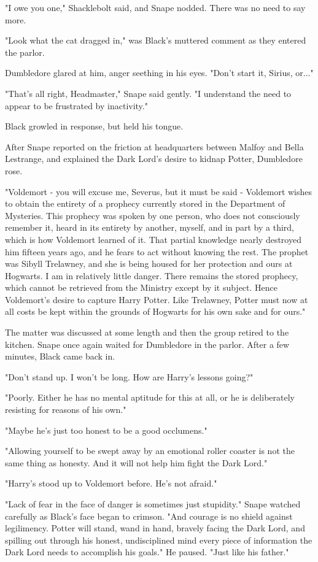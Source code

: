 "I owe you one," Shacklebolt said, and Snape nodded. There was no need to say more.

"Look what the cat dragged in," was Black's muttered comment as they entered the parlor.

Dumbledore glared at him, anger seething in his eyes. "Don't start it, Sirius, or..."

"That's all right, Headmaster," Snape said gently. "I understand the need to appear to be frustrated by inactivity."

Black growled in response, but held his tongue.

After Snape reported on the friction at headquarters between Malfoy and Bella Lestrange, and explained the Dark Lord's desire to kidnap Potter, Dumbledore rose.

"Voldemort - you will excuse me, Severus, but it must be said - Voldemort wishes to obtain the entirety of a prophecy currently stored in the Department of Mysteries. This prophecy was spoken by one person, who does not consciously remember it, heard in its entirety by another, myself, and in part by a third, which is how Voldemort learned of it. That partial knowledge nearly destroyed him fifteen years ago, and he fears to act without knowing the rest. The prophet was Sibyll Trelawney, and she is being housed for her protection and ours at Hogwarts. I am in relatively little danger. There remains the stored prophecy, which cannot be retrieved from the Ministry except by it subject. Hence Voldemort's desire to capture Harry Potter. Like Trelawney, Potter must now at all costs be kept within the grounds of Hogwarts for his own sake and for ours."

The matter was discussed at some length and then the group retired to the kitchen. Snape once again waited for Dumbledore in the parlor. After a few minutes, Black came back in.

"Don't stand up. I won't be long. How are Harry's lessons going?"

"Poorly. Either he has no mental aptitude for this at all, or he is deliberately resisting for reasons of his own."

"Maybe he's just too honest to be a good occlumens."

"Allowing yourself to be swept away by an emotional roller coaster is not the same thing as honesty. And it will not help him fight the Dark Lord."

"Harry's stood up to Voldemort before. He's not afraid."

"Lack of fear in the face of danger is sometimes just stupidity." Snape watched carefully as Black's face began to crimson. "And courage is no shield against legilimency. Potter will stand, wand in hand, bravely facing the Dark Lord, and spilling out through his honest, undisciplined mind every piece of information the Dark Lord needs to accomplish his goals." He paused. "Just like his father."

